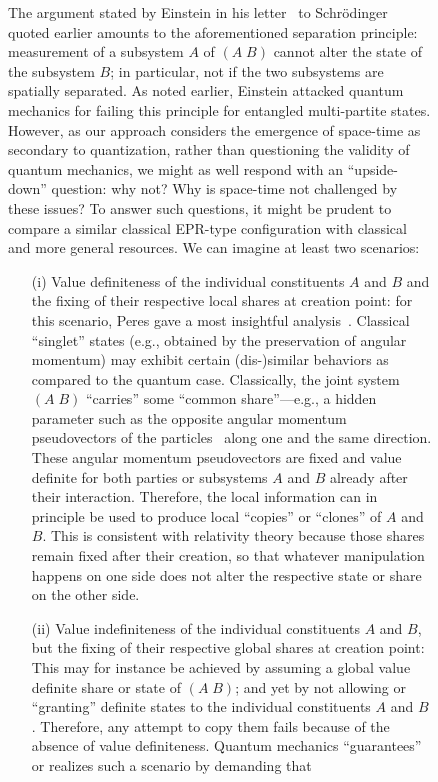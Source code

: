 \documentclass[entropy,article,accept,oneauthor,pdftex]{Definitions/mdpi}
\begin{document}
\begin{figure}[H]
The argument stated by Einstein in his letter~\cite{einstei-letter-to-schr,Meyenn-2011,Howard1985171} to Schr\"odinger quoted earlier
amounts to the aforementioned separation principle: measurement of a subsystem $A$ of $(A\;B)$
cannot alter the state of the subsystem $B$;
in particular, not if the two subsystems are spatially separated.
As noted earlier, Einstein attacked quantum mechanics for failing this principle for entangled multi-partite states.
However, as our approach considers the emergence of space-time as secondary to quantization,
rather than questioning the validity of quantum mechanics,
we might as well respond with an ``upside-down'' question: why not? Why is space-time not challenged by these issues?
To answer such questions, it might be prudent to compare a similar classical EPR-type configuration
with classical and more general resources.
We can imagine at least two scenarios:
\begin{itemize}
\item[(i)]
Value definiteness of the individual constituents $A$ and $B$ and the fixing of their respective local shares at creation point:
for this scenario, Peres gave a most insightful analysis~\cite{peres222}.
Classical ``singlet'' states (e.g., obtained by the preservation
of angular momentum) may exhibit certain (dis-)similar behaviors as compared to the quantum case.
Classically, the joint system $(A\;B)$ ``carries'' some ``common share''---e.g.,
a hidden parameter such as the opposite angular momentum pseudovectors
of the particles~\cite{peres,toner-bacon-03,svozil-2004-brainteaser} along one and the same direction.
These angular momentum pseudovectors are fixed and value definite for both parties or subsystems $A$ and $B$
already after their interaction.
Therefore, the local information can in principle be used to produce local ``copies'' or ``clones'' of $A$ and $B$.
This is consistent with relativity theory because those shares remain fixed after their creation,
so that whatever manipulation happens on one side does not alter the respective state or share on the other side.
\item[(ii)]
Value indefiniteness of the individual constituents $A$ and $B$, but the fixing of their respective global shares at creation point:
This may for instance be achieved by assuming a global value definite share or state of $(A\;B)$;
and yet by not allowing or ``granting'' definite states to the individual constituents $A$ and $B$.
Therefore, any attempt to copy them fails because of the absence of value definiteness.
Quantum mechanics ``guarantees'' or realizes such a scenario by demanding that

\end{itemize}
\end{figure}
\end{document}
